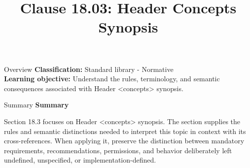 \documentclass[10pt,letterpaper]{article}
\title{Clause 18.03: Header Concepts Synopsis}
\author{}
\date{}
\begin{document}
\maketitle
\begin{CornellOverviewBox}{Overview}
\textbf{Classification:} Standard library - Normative\\[2pt]
\textbf{Learning objective:} Understand the rules, terminology, and semantic consequences associated with Header <concepts> synopsis.
\end{CornellOverviewBox}\begin{CornellSummaryBox}{Summary}
{\sffamily\bfseries\color{Accent} Summary}\par\vspace{3pt}Section 18.3 focuses on Header <concepts> synopsis. The section supplies the rules and semantic distinctions needed to interpret this topic in context with its cross-references. When applying it, preserve the distinction between mandatory requirements, recommendations, permissions, and behavior deliberately left undefined, unspecified, or implementation-defined.
\end{CornellSummaryBox}
\end{document}
